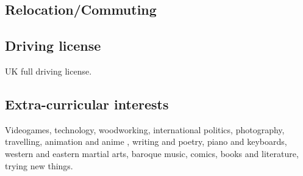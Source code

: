 \documentclass[a4paper,10pt]{article}
\begin{document}
        \subsection{Relocation/Commuting}

        \subsection{Driving license}
            UK full driving license.

        \subsection{Extra-curricular interests}
            Videogames, technology, woodworking, international politics, photography, travelling, animation and anime
            , writing and poetry, piano and keyboards, western and eastern martial arts, baroque music, comics, books
            and literature, trying new things.

            \newpage
\end{document}
